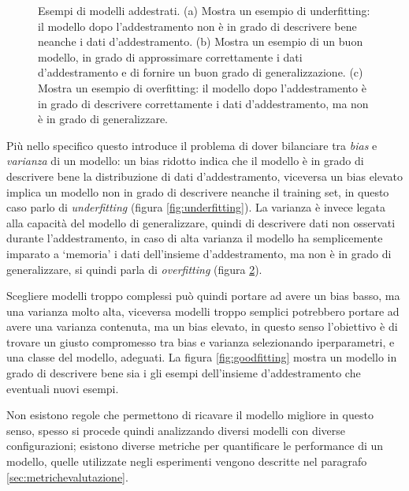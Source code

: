 \documentclass[../../main.tex]{subfiles}
\begin{document}
\begin{figure}[H]
\begin{subfigure}[t]{0.30\textwidth}
        \caption{}
        \label{fig:overfitting}
    \end{subfigure}
    \caption{Esempi di modelli addestrati. (a) Mostra un esempio di underfitting: il modello dopo l'addestramento non è in grado di descrivere bene neanche i dati d'addestramento. (b) Mostra un esempio di un buon modello, in grado di approssimare correttamente i dati d'addestramento e di fornire un buon grado di generalizzazione. (c) Mostra un esempio di overfitting: il modello dopo l'addestramento è in grado di descrivere correttamente i dati d'addestramento, ma non è in grado di generalizzare.}
\end{figure}

Più nello specifico questo introduce il problema di dover bilanciare tra \textit{bias} e \textit{varianza} di un modello: un bias ridotto indica che il modello è in grado di descrivere bene la distribuzione di dati d'addestramento, viceversa un bias elevato implica un modello non in grado di descrivere neanche il training set, in questo caso parlo di \textit{underfitting} (figura \ref{fig:underfitting}). La varianza è invece legata alla capacità del modello di generalizzare, quindi di descrivere dati non osservati durante l'addestramento, in caso di alta varianza il modello ha semplicemente imparato a `memoria' i dati dell'insieme d'addestramento, ma non è in grado di generalizzare, si quindi parla di \textit{overfitting} (figura \ref{fig:overfitting}).

Scegliere modelli troppo complessi può quindi portare ad avere un bias basso, ma una varianza molto alta, viceversa modelli troppo semplici potrebbero portare ad avere una varianza contenuta, ma un bias elevato, in questo senso l'obiettivo è di trovare un giusto compromesso tra bias e varianza selezionando iperparametri, e una classe del modello, adeguati. La figura \ref{fig:goodfitting} mostra un modello in grado di descrivere bene sia i gli esempi dell'insieme d'addestramento che eventuali nuovi esempi.

Non esistono regole che permettono di ricavare il modello migliore in questo senso, spesso si procede quindi analizzando diversi modelli con diverse configurazioni; esistono diverse metriche per quantificare le performance di un modello, quelle utilizzate negli esperimenti vengono descritte nel paragrafo \ref{sec:metrichevalutazione}.
\end{document}
